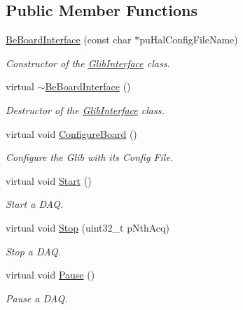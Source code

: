 \subsection*{Public Member Functions}
\begin{DoxyCompactItemize}
\item 
\hyperlink{class_ph2___hw_interface_1_1_be_board_interface_a77f4c3f95a46b345ef3607f8f071333b}{Be\-Board\-Interface} (const char $\ast$pu\-Hal\-Config\-File\-Name)
\begin{DoxyCompactList}\small\item\em Constructor of the \hyperlink{class_ph2___hw_interface_1_1_glib_interface}{Glib\-Interface} class. \end{DoxyCompactList}\item 
virtual \hyperlink{class_ph2___hw_interface_1_1_be_board_interface_ad67b2d931b904565cf6e5881fa0d140e}{$\sim$\-Be\-Board\-Interface} ()
\begin{DoxyCompactList}\small\item\em Destructor of the \hyperlink{class_ph2___hw_interface_1_1_glib_interface}{Glib\-Interface} class. \end{DoxyCompactList}\item 
virtual void \hyperlink{class_ph2___hw_interface_1_1_be_board_interface_a8bb4c51e30c7a969833f1fe83d005b00}{Configure\-Board} ()
\begin{DoxyCompactList}\small\item\em Configure the Glib with its Config File. \end{DoxyCompactList}\item 
virtual void \hyperlink{class_ph2___hw_interface_1_1_be_board_interface_af0e7befff69ce3743b15ed1a99b13805}{Start} ()
\begin{DoxyCompactList}\small\item\em Start a D\-A\-Q. \end{DoxyCompactList}\item 
virtual void \hyperlink{class_ph2___hw_interface_1_1_be_board_interface_a4a5023dc6400ea99f87b672135fb4ef9}{Stop} (uint32\-\_\-t p\-Nth\-Acq)
\begin{DoxyCompactList}\small\item\em Stop a D\-A\-Q. \end{DoxyCompactList}\item 
virtual void \hyperlink{class_ph2___hw_interface_1_1_be_board_interface_a6b539fb5557c67c09aea751877829c7e}{Pause} ()
\begin{DoxyCompactList}\small\item\em Pause a D\-A\-Q. \end{DoxyCompactList}\item 

\end{DoxyCompactItemize}
